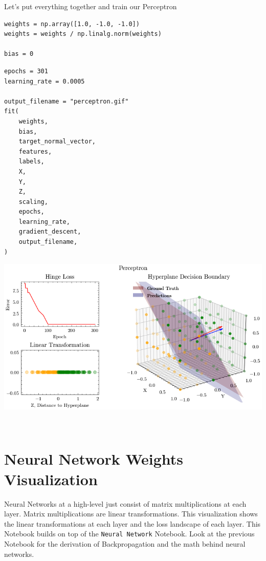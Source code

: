 \documentclass[openany]{book}
\begin{document}
    Let's put everything together and train our Perceptron

\begin{tcolorbox}
\tiny
\begin{verbatim}
weights = np.array([1.0, -1.0, -1.0])
weights = weights / np.linalg.norm(weights)

bias = 0
\end{verbatim}
\end{tcolorbox}

\begin{tcolorbox}
\tiny
\begin{verbatim}
epochs = 301
learning_rate = 0.0005

output_filename = "perceptron.gif"
fit(
    weights,
    bias,
    target_normal_vector,
    features,
    labels,
    X,
    Y,
    Z,
    scaling,
    epochs,
    learning_rate,
    gradient_descent,
    output_filename,
)
\end{verbatim}
\end{tcolorbox}

    \begin{center}
    \includegraphics[width=\textwidth]{combined_files/combined_121_1.png}
    \end{center}
    { \hspace*{\fill} \\}
        
    \section{Neural Network Weights
Visualization}\label{neural-network-weights-visualization}

Neural Networks at a high-level just consist of matrix multiplications
at each layer. Matrix multiplications are linear transformations. This
visualization shows the linear transformations at each layer and the
loss landscape of each layer. This Notebook builds on top of the
\texttt{Neural\ Network} Notebook. Look at the previous Notebook for the
derivation of Backpropagation and the math behind neural networks.
\end{document}
